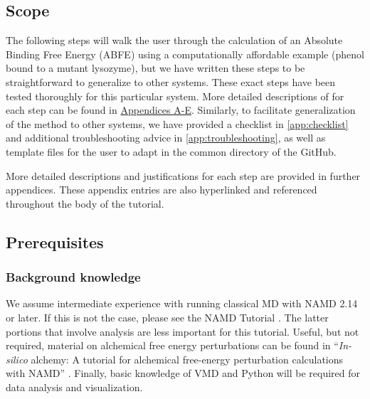 \documentclass[9pt,tutorial]{Styling/livecoms}
\begin{document}
\subsection{Scope}
The following steps will walk the user through the calculation of an Absolute Binding Free Energy (ABFE) using a computationally affordable example (phenol bound to a mutant lysozyme), but we have written these steps to be straightforward to generalize to other systems.
These exact steps have been tested thoroughly for this particular system.
More detailed descriptions of for each step can be found in \hyperref[app:motivation]{Appendices A-E}. Similarly, to facilitate generalization of the method to other systems, we have provided a checklist in \ref{app:checklist} and additional troubleshooting advice in \ref{app:troubleshooting}, as well as template files for the user to adapt in the common directory of the GitHub.

More detailed descriptions and justifications for each step are provided in further appendices. These appendix entries are also hyperlinked and referenced throughout the body of the tutorial.

\subsection{Prerequisites}
    \subsubsection{Background knowledge}\label{sec:prerequisites}
    
    We assume intermediate experience with running classical MD with NAMD 2.14 or later. If this is not the case, please see the NAMD Tutorial \cite{phillips2003}. The latter portions that involve analysis are less important for this tutorial. Useful, but not required, material on alchemical free energy perturbations can be found in “\textit{In-silico} alchemy: A tutorial for alchemical free-energy perturbation calculations with NAMD” \cite{Henin2017}. Finally, basic knowledge of VMD and Python will be required for data analysis and visualization.  
\end{document}
